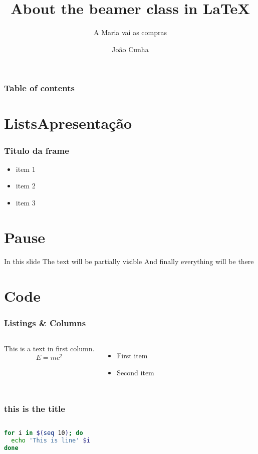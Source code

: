 \documentclass[serif]{beamer}
\title[Beamer]{About the beamer class in \LaTeX{}}
\subtitle{A Maria vai as compras}
\author[João]{João Cunha}
\institute[ESTG]{Escola Superiror de Tecnologia e Gestão}
\begin{document}
  \frame{\titlepage}

  \begin{frame}
    \frametitle{Table of contents}
    \tableofcontents
  \end{frame}

  \section{ListsApresentação}

  \begin{frame}
    \frametitle{Titulo da frame}
    \begin{itemize}
      \item<1-> item 1
      \item<2-> item 2
      \item<3-> item 3
    \end{itemize}
  \end{frame}

  \section{Pause}
  \begin{frame}
    In this slide \pause%
    The text will be partially visible \pause%
    And finally everything will be there
  \end{frame}

  \section{Code}

  \begin{frame}
    \frametitle{Listings \& Columns}

    \begin{columns}
      This is a text in first column.
      \[ E=mc^2 \]
      \begin{itemize}
        \item First item
        \item Second item
      \end{itemize}

      
    \end{columns}
  \end{frame}

  \begin{frame}[fragile]
    \frametitle{this is the title}

    \begin{columns}
    \begin{lstlisting}[language=bash]
for i in $(seq 10); do
  echo 'This is line' $i
done
    \end{lstlisting}

    \end{columns}

  \end{frame}
\end{document}
